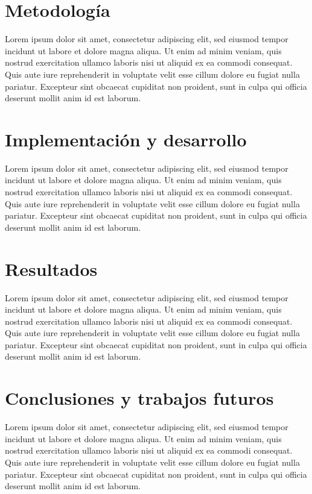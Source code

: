 \chapter{Metodología}
Lorem ipsum dolor sit amet, consectetur adipiscing elit, sed eiusmod tempor incidunt ut labore et dolore magna aliqua.
Ut enim ad minim veniam, quis nostrud exercitation ullamco laboris nisi ut aliquid ex ea commodi consequat.
Quis aute iure reprehenderit in voluptate velit esse cillum dolore eu fugiat nulla pariatur.
Excepteur sint obcaecat cupiditat non proident, sunt in culpa qui officia deserunt mollit anim id est laborum.

\chapter{Implementación y desarrollo}
Lorem ipsum dolor sit amet, consectetur adipiscing elit, sed eiusmod tempor incidunt ut labore et dolore magna aliqua.
Ut enim ad minim veniam, quis nostrud exercitation ullamco laboris nisi ut aliquid ex ea commodi consequat.
Quis aute iure reprehenderit in voluptate velit esse cillum dolore eu fugiat nulla pariatur.
Excepteur sint obcaecat cupiditat non proident, sunt in culpa qui officia deserunt mollit anim id est laborum.

\chapter{Resultados}
Lorem ipsum dolor sit amet, consectetur adipiscing elit, sed eiusmod tempor incidunt ut labore et dolore magna aliqua.
Ut enim ad minim veniam, quis nostrud exercitation ullamco laboris nisi ut aliquid ex ea commodi consequat.
Quis aute iure reprehenderit in voluptate velit esse cillum dolore eu fugiat nulla pariatur.
Excepteur sint obcaecat cupiditat non proident, sunt in culpa qui officia deserunt mollit anim id est laborum.

\chapter{Conclusiones y trabajos futuros}
Lorem ipsum dolor sit amet, consectetur adipiscing elit, sed eiusmod tempor incidunt ut labore et dolore magna aliqua.
Ut enim ad minim veniam, quis nostrud exercitation ullamco laboris nisi ut aliquid ex ea commodi consequat.
Quis aute iure reprehenderit in voluptate velit esse cillum dolore eu fugiat nulla pariatur.
Excepteur sint obcaecat cupiditat non proident, sunt in culpa qui officia deserunt mollit anim id est laborum.

